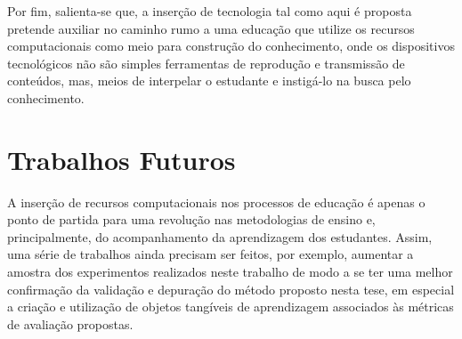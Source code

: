 Por fim, salienta-se que,
a inserção de tecnologia tal como aqui é proposta pretende auxiliar no caminho rumo a uma educação que utilize os recursos computacionais como meio para construção do conhecimento,%
onde os dispositivos tecnológicos não são simples ferramentas de reprodução e transmissão de conteúdos, mas, meios de interpelar o estudante e instigá-lo na busca pelo conhecimento.

\section{Trabalhos Futuros}

A inserção de recursos computacionais nos processos de educação é apenas o ponto de partida para uma revolução nas metodologias de ensino e, principalmente, do acompanhamento da aprendizagem dos estudantes. Assim, uma série de trabalhos ainda precisam ser feitos, por exemplo, aumentar a amostra dos experimentos realizados neste trabalho de modo a se ter uma melhor confirmação da validação e depuração do método proposto nesta tese, em especial a criação e utilização de objetos tangíveis de aprendizagem associados às métricas de avaliação propostas.


